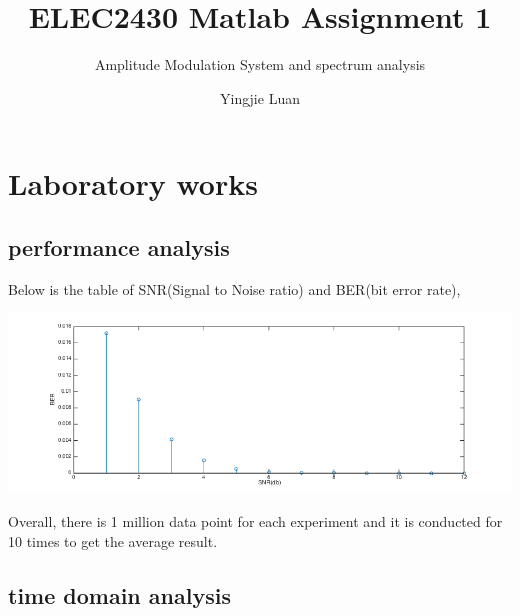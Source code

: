 \documentclass[11pt]{scrartcl}
\begin{document}
\title{ELEC2430 Matlab Assignment 1}
\subtitle{ Amplitude Modulation System and spectrum analysis}
\author{Yingjie Luan}
\maketitle

\tableofcontents

\section{Laboratory works}
\subsection{performance analysis }
Below is the table of SNR(Signal to Noise ratio) and BER(bit error rate),

\FloatBarrier
{}
\FloatBarrier


\begin{minipage}[t]{\linewidth}

{
\includegraphics[scale = 0.5]{per.png}
}
\end{minipage}
\medskip

Overall, there is 1 million data point for each experiment and it is conducted for 10 times to get the average result.
\subsection{time domain analysis }
\end{document}
